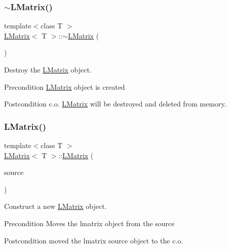 \subsubsection{\texorpdfstring{$\sim$LMatrix()}{~LMatrix()}}
{\footnotesize\ttfamily template$<$class T $>$ \\
\mbox{\hyperlink{class_l_matrix}{L\+Matrix}}$<$ T $>$\+::$\sim$\mbox{\hyperlink{class_l_matrix}{L\+Matrix}} (\begin{DoxyParamCaption}{ }\end{DoxyParamCaption})}



Destroy the \mbox{\hyperlink{class_l_matrix}{L\+Matrix}} object. 

\begin{DoxyPrecond}{Precondition}
\mbox{\hyperlink{class_l_matrix}{L\+Matrix}} object is created 
\end{DoxyPrecond}
\begin{DoxyPostcond}{Postcondition}
c.\+o. \mbox{\hyperlink{class_l_matrix}{L\+Matrix}} will be destroyed and deleted from memory. 
\end{DoxyPostcond}
\mbox{\label{class_l_matrix_a30c31d51a4ee693b725d0acec95c430f}} 
\subsubsection{\texorpdfstring{LMatrix()}{LMatrix()}\hspace{0.1cm}{\footnotesize\ttfamily [5/5]}}
{\footnotesize\ttfamily template$<$class T $>$ \\
\mbox{\hyperlink{class_l_matrix}{L\+Matrix}}$<$ T $>$\+::\mbox{\hyperlink{class_l_matrix}{L\+Matrix}} (\begin{DoxyParamCaption}\item[{\mbox{\hyperlink{class_l_matrix}{L\+Matrix}}$<$ T $>$ \&\&}]{source }\end{DoxyParamCaption})}



Construct a new \mbox{\hyperlink{class_l_matrix}{L\+Matrix}} object. 

\begin{DoxyPrecond}{Precondition}
Moves the lmatrix object from the source 
\end{DoxyPrecond}
\begin{DoxyPostcond}{Postcondition}
moved the lmatrix source object to the c.\+o.
\end{DoxyPostcond}

